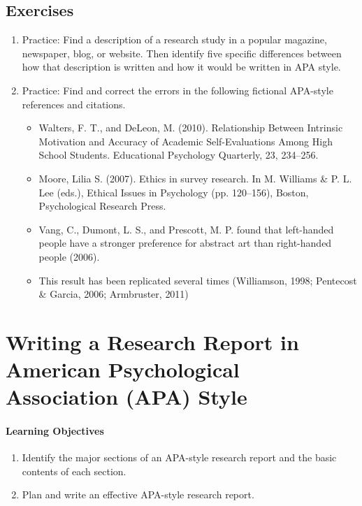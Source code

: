 \subsection{Exercises}
\begin{fullwidth}
\begin{enumerate}
\item Practice: Find a description of a research study in a popular magazine, newspaper, blog, or website. Then identify five specific differences between how that description is written and how it would be written in APA style.


\item Practice: Find and correct the errors in the following fictional APA-style references and citations.

\begin{itemize}
\item Walters, F. T., and DeLeon, M. (2010). Relationship Between Intrinsic Motivation and Accuracy of Academic Self-Evaluations Among High School Students. Educational Psychology Quarterly, 23, 234–256.

\item Moore, Lilia S. (2007). Ethics in survey research. In M. Williams \& P. L. Lee (eds.), Ethical Issues in Psychology (pp. 120–156), Boston, Psychological Research Press.

\item Vang, C., Dumont, L. S., and Prescott, M. P. found that left-handed people have a stronger preference for abstract art than right-handed people (2006).

\item This result has been replicated several times (Williamson, 1998; Pentecost \& Garcia, 2006; Armbruster, 2011)

\end{itemize}
\end{enumerate}
\end{fullwidth}


\section{Writing a Research Report in American Psychological Association (APA) Style}

\paragraph{Learning Objectives}
    \begin{enumerate}
    \item   Identify the major sections of an APA-style research report and the basic contents of each section.

    \item Plan and write an effective APA-style research report.

      \end{enumerate}


